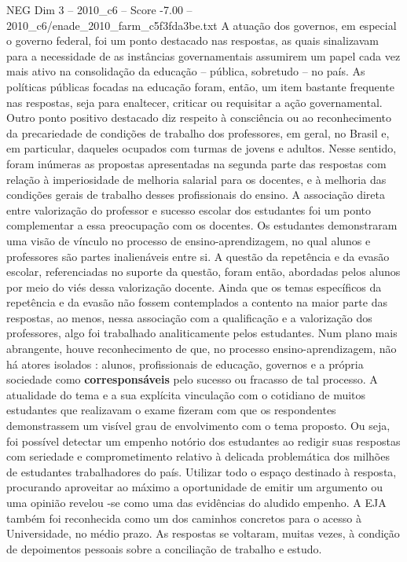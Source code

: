 \begin{textsample}{NEG Dim 3 – 2010\_c6 – Score -7.00 – 2010\_c6/enade\_2010\_farm\_c5f3fda3be.txt}
A atuação dos governos, em especial o governo federal, foi um ponto destacado nas respostas, as quais sinalizavam para a necessidade de as instâncias governamentais assumirem um papel cada vez mais ativo na consolidação da educação – pública, sobretudo – no país.
As políticas públicas focadas na educação foram, então, um item bastante frequente nas respostas, seja para enaltecer, criticar ou requisitar a ação governamental.
Outro ponto positivo destacado diz respeito à consciência ou ao reconhecimento da precariedade de condições de trabalho dos professores, em geral, no Brasil e, em particular, daqueles ocupados com turmas de jovens e adultos.
Nesse sentido, foram inúmeras as propostas apresentadas na segunda parte das respostas com relação à imperiosidade de melhoria salarial para os docentes, e à melhoria das condições gerais de trabalho desses profissionais do ensino.
A associação direta entre valorização do professor e sucesso escolar dos estudantes foi um ponto complementar a essa preocupação com os docentes.
Os estudantes demonstraram uma visão de vínculo no processo de ensino-aprendizagem, no qual alunos e professores são partes inalienáveis entre si.
A questão da repetência e da evasão escolar, referenciadas no suporte da questão, foram então, abordadas pelos alunos por meio do viés dessa valorização docente.
Ainda que os temas específicos da repetência e da evasão não fossem contemplados a contento na maior parte das respostas, ao menos, nessa associação com a qualificação e a valorização dos professores, algo foi trabalhado analiticamente pelos estudantes.
Num plano mais abrangente, houve reconhecimento de que, no processo ensino-aprendizagem, não há atores isolados : alunos, profissionais de educação, governos e a própria sociedade como \textbf{corresponsáveis} pelo sucesso ou fracasso de tal processo.
A atualidade do tema e a sua explícita vinculação com o cotidiano de muitos estudantes que realizavam o exame fizeram com que os respondentes demonstrassem um visível grau de envolvimento com o tema proposto.
Ou seja, foi possível detectar um empenho notório dos estudantes ao redigir suas respostas com seriedade e comprometimento relativo à delicada problemática dos milhões de estudantes trabalhadores do país.
Utilizar todo o espaço destinado à resposta, procurando aproveitar ao máximo a oportunidade de emitir um argumento ou uma opinião revelou -se como uma das evidências do aludido empenho.
A EJA também foi reconhecida como um dos caminhos concretos para o acesso à Universidade, no médio prazo.
As respostas se voltaram, muitas vezes, à condição de depoimentos pessoais sobre a conciliação de trabalho e estudo.

\end{textsample}

